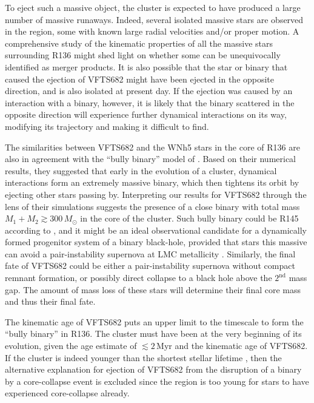 \documentclass[a4paper,fleqn,usenatbib]{mnras}
\DeclareRobustCommand{\Figref}[1]{Fig.~\ref{#1}}
\begin{document}
To eject such a massive object, the cluster is
expected to have produced
a large number of massive runaways. Indeed, several %
isolated massive stars are observed in the region, some with known
large radial velocities and/or proper motion. %
A comprehensive study of the kinematic
properties of all the massive stars surrounding R136 might shed light
on whether some can be unequivocally identified as merger products. It
is also possible that the star or binary that caused the ejection of
VFTS682 might have been ejected in the opposite direction, and is also
isolated at present day. If the ejection was caused by an interaction
with a binary, however, it is likely that the binary scattered in the
opposite direction will experience further dynamical interactions on
its way, modifying its trajectory and making it difficult to find.  %

The similarities between VFTS682 and the WNh5 stars in the core of
R136 are also in agreement with the ``bully binary'' model of
\cite{fujii:11}. Based on their numerical results, they suggested that
early in the evolution of a cluster, dynamical interactions form an extremely
massive binary, which then tightens its orbit by ejecting other stars passing
by. Interpreting our results for VFTS682 through the lens of their simulations
suggests the presence of a close binary with total mass
$M_1+M_2\gtrsim 300\,M_\odot$ in the core of the cluster. Such bully
binary could be R145 according to \cite{fujii:11}, and it might be an
ideal observational candidate for a dynamically formed progenitor system of
a binary black-hole, provided that stars this massive can avoid a
pair-instability supernova \cite[e.g.,][]{rakavy:67} at LMC
metallicity \citep[see also][]{langer:07}. Similarly, the final fate of VFTS682 could be either a
pair-instability supernova without compact remnant formation, or
possibly direct collapse to a black hole above the $2^\mathrm{nd}$
mass gap. The amount of mass loss of these stars will determine their final core
mass and thus their final fate.

The kinematic age of VFTS682 puts an
upper limit to the timescale to form the ``bully binary'' in
R136. The cluster must have been at the very beginning of its
evolution, given the age estimate of $\lesssim 2$\,Myr
\citep[][]{crowther:10,sabbi:12} and the kinematic age of VFTS682. If the
cluster is indeed younger than the shortest stellar lifetime
\citep[$\sim$3\,Myr, e.g.,][]{brott:11, zapartas:17}, then the alternative
explanation for ejection of VFTS682 from the disruption of a binary
by a core-collapse event is excluded since the region is too young for stars
to have experienced core-collapse already.
\end{document}
